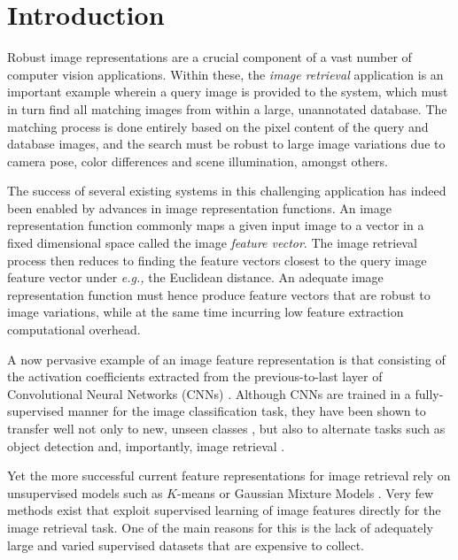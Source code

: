 \section{Introduction}

Robust image representations are a crucial component of a vast number of computer vision applications. Within these, the \emph{image retrieval} application is an important example wherein a query image is provided to the system, which must in turn find all matching images from within a large, unannotated database. The matching process is done entirely based on the pixel content of the query and database images, and the search must be robust to large image variations due to camera pose, color differences and scene illumination, amongst others.

The success of several existing systems in this challenging application has indeed been enabled by advances in  image representation functions. An image representation function commonly maps a given input image to a vector in a fixed dimensional space called the image \emph{feature vector}. The image retrieval process then reduces to finding the feature vectors closest to the query image feature vector under {\it e.g.,} the Euclidean distance. An adequate image representation function must hence produce feature vectors that are robust to image variations, while at the same time incurring low feature extraction computational overhead.

A now pervasive example of an image feature representation is that consisting of the activation coefficients extracted from the previous-to-last layer of Convolutional Neural Networks (CNNs) \cite{Krizhevsky2012}. Although CNNs are trained in a fully-supervised manner for the image classification task, they have been shown to transfer well not only to new, unseen classes \cite{Oquaba,Chatfield2014}, but also to alternate tasks such as object detection \cite{Girshick2014} and, importantly, image retrieval \cite{Sharif}.

Yet the more successful current feature representations for image retrieval rely on unsupervised models such as $K$-means \cite{Delhumeau2013} or Gaussian Mixture Models \cite{Perronnin2010}. Very few methods \cite{Arandjelovic15,Rana,Bilen2015} exist that exploit supervised learning of image features directly for the image retrieval task. One of the main reasons for this is the lack of adequately large and varied supervised datasets that are expensive to collect.

